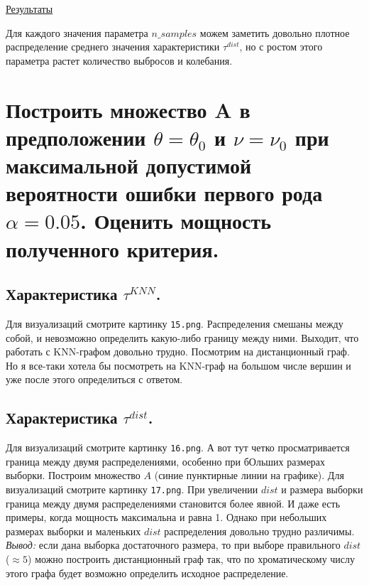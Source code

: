 \documentclass{report}
\begin{document}
\href{https://github.com/misshimichka/dm-random-graphs/blob/dmitrii/report/report/fix_sigma_norm_mis_dist.png}{Результаты}

Для каждого значения параметра $n\_samples$ можем заметить довольно плотное распределение среднего значения характеристики $\tau^{dist}$, но с ростом этого параметра растет количество выбросов и колебания.

\chapter{Построить множество A в предположении $\theta = \theta_0$ и $\nu = \nu_0$ при максимальной допустимой вероятности ошибки первого рода $\alpha = 0.05$. Оценить мощность полученного критерия.}
\section{Характеристика $\tau^{KNN}$.}
Для визуализаций смотрите картинку \texttt{15.png}.
\newline
\newline
Распределения смешаны между собой, и невозможно определить какую-либо границу между ними. Выходит, что работать с KNN-графом довольно трудно. Посмотрим на дистанционный граф. 
\newline
\newline
Но я все-таки хотела бы посмотреть на KNN-граф на большом числе вершин и уже после этого определиться с ответом.

\section{Характеристика $\tau^{dist}$.}
Для визуализаций смотрите картинку \texttt{16.png}.
\newline
\newline
А вот тут четко просматривается граница между двумя распределениями, особенно при бОльших размерах выборки. Построим множество $A$ (синие пунктирные линии на графике).
\newline
\newline
Для визуализаций смотрите картинку \texttt{17.png}.
\newline
\newline
При увеличении $dist$ и размера выборки граница между двумя распределениями становится более явной. И даже есть примеры, когда мощность максимальна и равна 1.
Однако при небольших размерах выборки и маленьких $dist$ распределения довольно трудно различимы.
\newline
\newline
\emph{Вывод:} если дана выборка достаточного размера, то при выборе правильного $dist$ ($\approx 5$) можно построить дистанционный граф так, что по хроматическому числу этого графа будет возможно определить исходное распределение.
\end{document}
